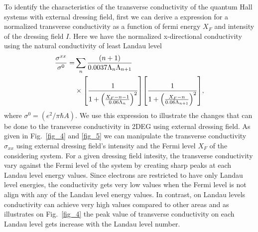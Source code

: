 
To identify the characteristics of the transverse conductivity of the quantum Hall systems with external dressing field, first we can derive a expression for a normalized
transverse conductivity as a function of fermi energy $X_F$ and intensity of the dressing field $I$. Here we have the normalized x-directional conductivity using the natural conductivity of least Landau level
\begin{equation} \label{eq_35}
  \begin{aligned}
    \frac{\sigma^{xx}}{\sigma^{0}} = &
    \sum_{n}
    \frac{\qty(n+1)}{0.0037\Lambda_n \Lambda_{n+1}} \\
    & \times
    \qty[
      \frac{1}
      {
        1 + \qty(\frac{X_F - n -1}{0.06\Lambda_n})^2
      }
    ]
    \qty[
      \frac{1}
      {
        1 + \qty(\frac{X_F - n}{0.06\Lambda_{n+1}})^2
      }
    ],
  \end{aligned}
\end{equation}
where $\sigma^0 = (e^2/\pi \hbar A)$. We use this expression to illustrate the changes that can be done to the transverse conductivity in 2DEG using external dressing field. As given in Fig.~\ref{fig_4} and \ref{fig_5} we can manipulate the transverse conductivity $\sigma_{xx}$ using external dressing field's intensity and the Fermi level $X_F$ of the considering system. For a given dressing field intesity, the transverse conductivity vary against the Fermi level of the system by creating sharp peaks at each Landau level energy values. Since electrons are restricted to have only Landau level energies, the conductivity gets very low values when the Fermi level is not align with any of the Landau level energy values. In contrast, on Landau levels conductivity can achieve very high values compared to other areas and as illustrates on Fig.~\ref{fig_4} the peak value of transverse conductivity on each Landau level gets increase with the Landau level number.

